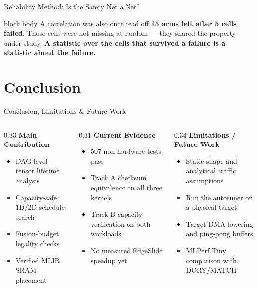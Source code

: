 \documentclass[10pt,aspectratio=169]{beamer}
\begin{document}
\begin{frame}{Reliability Method: Is the Safety Net a Net?}
\vspace{0.1cm}
\begin{beamercolorbox}[sep=0.25em,center,rounded=true,shadow=true]{block body}
\footnotesize
A correlation was also once read off \textbf{15 arms left after 5 cells failed}.
Those cells were not missing at random --- they shared the property under
study. \textbf{A statistic over the cells that survived a failure is a
statistic about the failure.}
\end{beamercolorbox}
\end{frame}

\section{Conclusion}
\begin{frame}{Conclusion, Limitations \& Future Work}
\begin{columns}[T]
\begin{column}{0.33\textwidth}
\textbf{Main Contribution}
\begin{itemize}
\small
\item DAG-level tensor lifetime analysis
\item Capacity-safe 1D/2D schedule search
\item Fusion-budget legality checks
\item Verified MLIR SRAM placement
\end{itemize}
\end{column}

\begin{column}{0.31\textwidth}
\textbf{Current Evidence}
\begin{itemize}
\small
\item 507 non-hardware tests pass
\item Track A checksum equivalence on all three kernels
\item Track B capacity verification on both workloads
\item No measured EdgeSlide speedup yet
\end{itemize}
\end{column}

\begin{column}{0.34\textwidth}
\textbf{Limitations / Future Work}
\begin{itemize}
\small
\item Static-shape and analytical traffic assumptions
\item Run the autotuner on a physical target
\item Target DMA lowering and ping-pong buffers
\item MLPerf Tiny comparison with DORY/MATCH
\end{itemize}
\end{column}
\end{columns}
\end{frame}
\end{document}
